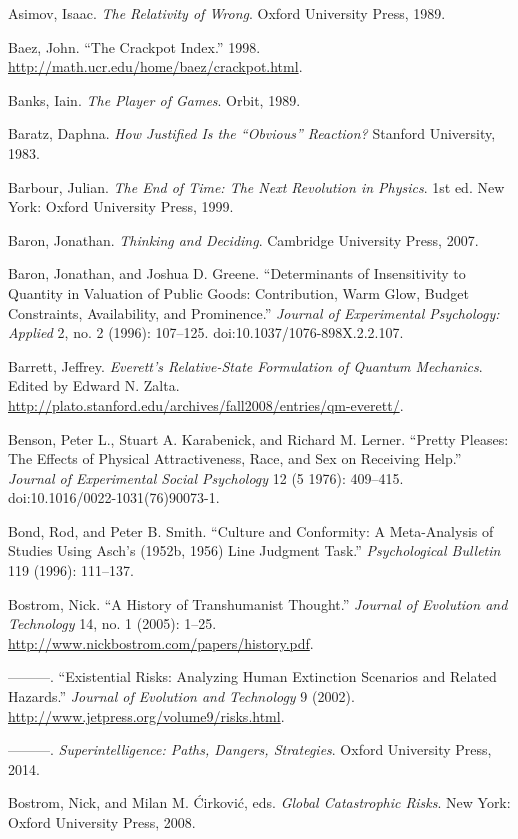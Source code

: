 \documentclass[letterpaper]{book}
\begin{document}
{
 Asimov, Isaac. \textit{The Relativity of Wrong}. Oxford University
Press, 1989.}

{
 Baez, John. ``The Crackpot
Index.'' 1998.
\url{http://math.ucr.edu/home/baez/crackpot.html}.}

{
 Banks, Iain. \textit{The Player of Games}. Orbit, 1989.}

{
 Baratz, Daphna. \textit{How Justified Is the
``Obvious'' Reaction?} Stanford
University, 1983.}

{
 Barbour, Julian. \textit{The End of Time: The Next Revolution in
Physics}. 1st ed. New York: Oxford University Press, 1999.}

{
 Baron, Jonathan. \textit{Thinking and Deciding}. Cambridge
University Press, 2007.}

{
 Baron, Jonathan, and Joshua D. Greene.
``Determinants of Insensitivity to Quantity in
Valuation of Public Goods: Contribution, Warm Glow, Budget Constraints,
Availability, and Prominence.'' \textit{Journal of
Experimental Psychology: Applied} 2, no. 2 (1996): 107--125.
doi:10.1037/1076-898X.2.2.107.}

{
 Barrett, Jeffrey. \textit{Everett's Relative-State
Formulation of Quantum Mechanics}. Edited by Edward N. Zalta.
\url{http://plato.stanford.edu/archives/fall2008/entries/qm-everett/}.}

{
 Benson, Peter L., Stuart A. Karabenick, and Richard M. Lerner.
``Pretty Pleases: The Effects of Physical
Attractiveness, Race, and Sex on Receiving Help.''
\textit{Journal of Experimental Social Psychology} 12 (5 1976):
409--415. doi:10.1016/0022-1031(76)90073-1.}

{
 Bond, Rod, and Peter B. Smith. ``Culture and
Conformity: A Meta-Analysis of Studies Using Asch's
(1952b, 1956) Line Judgment Task.''
\textit{Psychological Bulletin} 119 (1996): 111--137.}

{
 Bostrom, Nick. ``A History of Transhumanist
Thought.'' \textit{Journal of Evolution and
Technology} 14, no. 1 (2005): 1--25.
\url{http://www.nickbostrom.com/papers/history.pdf}.}

{
 {}---{}---{}---. ``Existential Risks: Analyzing
Human Extinction Scenarios and Related Hazards.''
\textit{Journal of Evolution and Technology} 9 (2002).
\url{http://www.jetpress.org/volume9/risks.html}.}

{
 {}---{}---{}---. \textit{Superintelligence: Paths, Dangers,
Strategies}. Oxford University Press, 2014.}

{
 Bostrom, Nick, and Milan M. \'Cirkovi\'c, eds. \textit{Global
Catastrophic Risks}. New York: Oxford University Press, 2008.}
\end{document}

